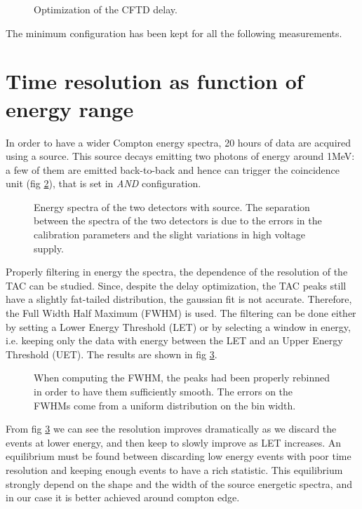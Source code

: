 \documentclass[11pt,a4 paper]{article}
\begin{document}
\begin{figure}[H]
    \centering
    \caption{Optimization of the CFTD delay.}
    \label{fig:CFTD:delay}
\end{figure}

The minimum configuration has been kept for all the following measurements.

\section{Time resolution as function of energy range} \label{sec:Co}
In order to have a wider Compton energy spectra, 20 hours of data are acquired using a  source. This source decays emitting two photons of energy around 1\si{\mega\electronvolt}: a few of them are emitted back-to-back and hence can trigger the coincidence unit (fig \ref{fig:Co:spectra}), that is set in \emph{AND} configuration.


\begin{figure}[H]
    \centering
    \caption{Energy spectra of the two detectors with  source. The separation between the spectra of the two detectors is due to the errors in the calibration parameters and the slight variations in high voltage supply.}
    \label{fig:Co:spectra}
\end{figure}

Properly filtering in energy the spectra, the dependence of the resolution of the TAC can be studied. Since, despite the delay optimization, the TAC peaks still have a slightly fat-tailed distribution, the gaussian fit is not accurate. Therefore, the Full Width Half Maximum (FWHM) is used.
The filtering can be done either by setting a Lower Energy Threshold (LET) or by selecting a window in energy, i.e. keeping only the data with energy between the LET and an Upper Energy Threshold (UET). The results are shown in fig \ref{fig:Co:results}.

\begin{figure}[H]
    \centering
    \caption{When computing the FWHM, the peaks had been properly rebinned in order to have them sufficiently smooth. The errors on the FWHMs come from a uniform distribution on the bin width.}
    \label{fig:Co:results}
\end{figure}

From fig \ref{fig:Co:results} we can see the resolution improves dramatically as we discard the events at lower energy, and then keep to slowly improve as LET increases. An equilibrium must be found between discarding low energy events with poor time resolution and keeping enough events to have a rich statistic. This equilibrium strongly depend on the shape and the width of the source energetic spectra, and in our case it is better achieved around compton edge.
\end{document}
